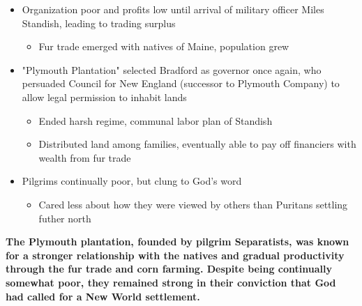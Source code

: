 \documentclass[a4paper]{article}
\begin{document}
{\begin{itemize}
\begin{itemize}
            \begin{itemize}
                \item Key helpers: Squanto and Samoset (Squanto spoke English due to previous capture by English, time in Europe)
                \item Marked allegiance to natives through invitation to first Thanksgiving in 1621
            \end{itemize}
            \item Good relationship did not last long: second smallpox epidemic wiped out most remaining
        \end{itemize}
        \item Organization poor and profits low until arrival of military officer Miles Standish, leading to trading surplus
        \begin{itemize}
            \item Fur trade emerged with natives of Maine, population grew
        \end{itemize}
        \item "Plymouth Plantation" selected Bradford as governor once again, who persuaded Council for New England (successor to Plymouth Company) to allow legal permission to inhabit lands
        \begin{itemize}
            \item Ended harsh regime, communal labor plan of Standish
            \item Distributed land among families, eventually able to pay off financiers with wealth from fur trade
        \end{itemize}
        \item Pilgrims continually poor, but clung to God's word
        \begin{itemize}
            \item Cared less about how they were viewed by others than Puritans settling futher north
        \end{itemize}
    \end{itemize}
    \textbf{The Plymouth plantation, founded by pilgrim Separatists, was known for a stronger relationship with the natives and gradual productivity through the fur trade and corn farming. Despite being continually somewhat poor, they remained strong in their conviction that God had called for a New World settlement.}}
\end{document}
